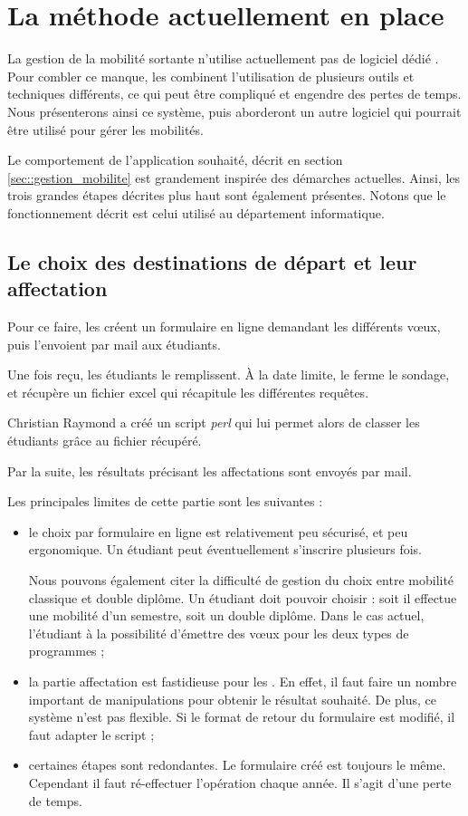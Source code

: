 
		\section{La méthode actuellement en place}
	

La gestion de la mobilité sortante n'utilise actuellement pas de logiciel dédié . 
Pour combler ce manque, les \ris combinent l'utilisation de plusieurs outils et techniques différents, ce qui peut être compliqué et engendre des pertes de temps. 
Nous présenterons ainsi ce système, puis aborderont un autre logiciel qui pourrait être utilisé pour gérer les mobilités.

\medbreak

Le comportement de l'application souhaité, décrit en section \ref{sec::gestion_mobilite} est grandement inspirée des démarches actuelles. 
Ainsi, les trois grandes étapes décrites plus haut sont également présentes. 
Notons que le fonctionnement  décrit est celui utilisé au département informatique.  
 \subsection{Le choix des destinations de départ et leur affectation}
		 
		Pour ce faire, les \ris créent un formulaire en ligne demandant les différents vœux, puis l'envoient par mail aux étudiants. 
		
		Une fois reçu, les étudiants le remplissent. À la date limite, le \ri ferme le sondage, et récupère un fichier excel qui récapitule les différentes requêtes. 
		
		Christian Raymond a créé un script \textit{perl} qui lui permet alors de classer les étudiants grâce au fichier récupéré.
		
		Par la suite, les résultats  précisant les affectations sont envoyés par mail. 
		
		\medbreak
		
		Les principales limites de cette partie sont les suivantes : 
		\begin{itemize}
		\item le choix par formulaire en ligne est relativement peu sécurisé, et peu ergonomique. Un étudiant peut  éventuellement s'inscrire plusieurs fois.
		
		Nous pouvons également citer la difficulté de gestion du choix entre mobilité classique et double diplôme. Un étudiant doit pouvoir choisir : soit il effectue une mobilité d'un semestre, soit un double diplôme. Dans le cas actuel, l'étudiant à la possibilité d'émettre des vœux pour les deux types de programmes ;
		
		\item la partie affectation est fastidieuse  pour les \ris. En effet, il faut faire un nombre important de manipulations pour obtenir le résultat  souhaité. De plus, ce système n'est pas flexible. Si le format de retour du formulaire est modifié, il faut adapter le script ;

		\item certaines étapes sont redondantes. Le formulaire créé est toujours le même. Cependant il faut ré-effectuer l'opération chaque année. Il s'agit d'une perte de temps.
			\end{itemize}

